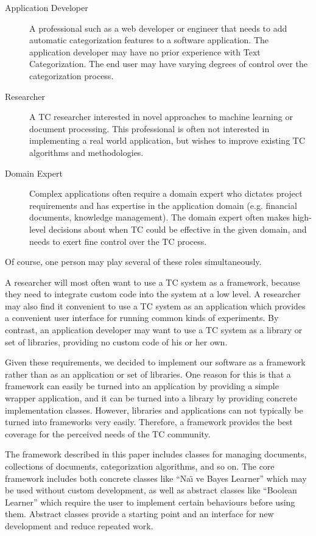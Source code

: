 \documentclass[a4paper,twocolumn]{article}
\begin{document}
\begin{description}
\item[Application Developer] A professional such as a web developer or
engineer that needs to add automatic categorization features to a
software application. The application developer may have no prior
experience with Text Categorization.  The end user may have varying
degrees of control over the categorization process.

\item[Researcher] A TC researcher interested in novel approaches to
machine learning or document processing.  This professional is often
not interested in implementing a real world application, but wishes to
improve existing TC algorithms and methodologies.

\item[Domain Expert] Complex applications often require a domain
expert who dictates project requirements and has expertise in the
application domain (e.g. financial documents, knowledge management).
The domain expert often makes high-level decisions about when TC could
be effective in the given domain, and needs to exert fine control over
the TC process.
\end{description}

Of course, one person may play several of these roles simultaneously.

A researcher will most often want to use a TC system as a framework,
because they need to integrate custom code into the system at a low
level.  A researcher may also find it convenient to use a TC system as
an application which provides a convenient user interface for running
common kinds of experiments.  By contrast, an application developer
may want to use a TC system as a library or set of libraries,
providing no custom code of his or her own.

Given these requirements, we decided to implement our software as a framework rather than as an application or set of libraries.  One reason for this is that a framework can easily be turned into an application by providing a simple wrapper application, and it can be turned into a library by providing concrete implementation classes.  However, libraries and applications can not typically be turned into frameworks very easily.  Therefore, a framework provides the best coverage for the perceived needs of the TC community.

The framework described in this paper includes classes for managing
documents, collections of documents, categorization algorithms, and so
on.  The core framework includes both concrete classes like ``Na\"\i
ve Bayes Learner'' which may be used without custom development, as
well as abstract classes like ``Boolean Learner'' which require the
user to implement certain behaviours before using them.  Abstract
classes provide a starting point and an interface for new development
and reduce repeated work.
\end{document}
